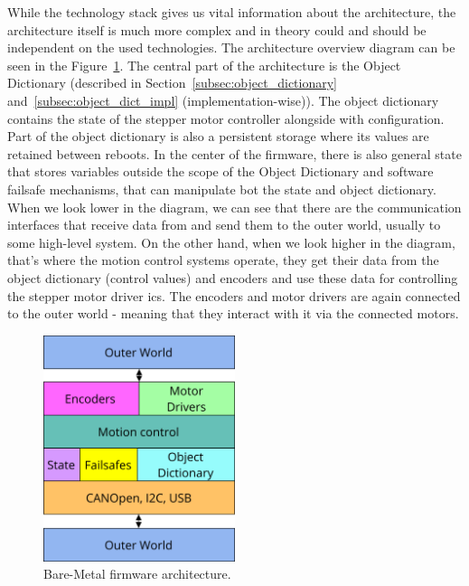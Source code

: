 While the technology stack gives us vital information about the architecture, the architecture itself is much more complex and in theory could and should be independent on the used technologies\cite{thomas_pragmatic_2019}.
The architecture overview diagram can be seen in the Figure~\ref{fig:firmware_arch}.
The central part of the architecture is the Object Dictionary (described in Section~\ref{subsec:object_dictionary} and~\ref{subsec:object_dict_impl} (implementation-wise)).
The object dictionary contains the state of the stepper motor controller alongside with configuration.
Part of the object dictionary is also a persistent storage where its values are retained between reboots.
In the center of the firmware, there is also general state that stores variables outside the scope of the Object Dictionary and software failsafe mechanisms, that can manipulate bot the state and object dictionary.
When we look lower in the diagram, we can see that there are the communication interfaces that receive data from and send them to the outer world, usually to some high-level system.
On the other hand, when we look higher in the diagram, that's where the motion control systems operate, they get their data from the object dictionary (control values) and encoders and use these data for controlling the stepper motor driver \acs{ic}s.
The encoders and motor drivers are again connected to the outer world - meaning that they interact with it via the connected motors.

\begin{figure}[H]
    \centering
    \includegraphics[width=0.5\textwidth]{obrazky/firmware_arch}
    \caption{Bare-Metal firmware architecture.}
    \label{fig:firmware_arch}
\end{figure}

